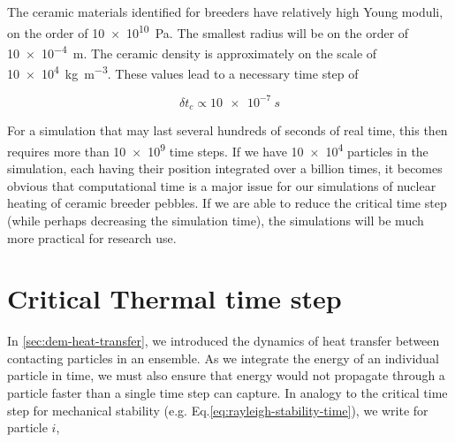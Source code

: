 
The ceramic materials identified for breeders have relatively high Young moduli, on the order of \SI{10e10}{\pascal}. The smallest radius will be on the order of \SI{10e-4}{\meter}. The ceramic density is approximately on the scale of \SI{10e4}{\kilogram\per\cubic\meter}. These values lead to a necessary time step of

\begin{equation}
	\delta t_c \propto \SI{10e-7}{s}
\end{equation}

For a simulation that may last several hundreds of seconds of real time, this then requires more than \num{10e9} time steps. If we have \num{10e4} particles in the simulation, each having their position integrated over a billion times, it becomes obvious that computational time is a major issue for our simulations of nuclear heating of ceramic breeder pebbles. If we are able to reduce the critical time step (while perhaps decreasing the simulation time), the simulations will be much more practical for research use.




\section{Critical Thermal time step}

In \cref{sec:dem-heat-transfer}, we introduced the dynamics of heat transfer between contacting particles in an ensemble. As we integrate the energy of an individual particle in time, we must also ensure that energy would not propagate through a particle faster than a single time step can capture. In analogy to the critical time step for mechanical stability (e.g. Eq.\ref{eq:rayleigh-stability-time}), we write for particle $i$,

